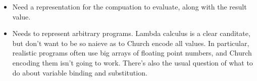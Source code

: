 \begin{itemize}
\item   Need a representation for the compuation to evaluate, along with the result value.
\item   Needs to represent arbitrary programs. Lambda calculus is a clear canditate,
        but don't want to be so naieve as to Church encode all values. In particular, realistic programs often use big arrays of floating point numbers, and Church encoding them isn't going to work. There's also the usual question of what to do about variable binding and substitution.

\end{itemize}